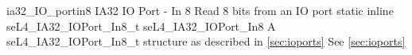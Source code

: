 %
%
%
%

\apidoc
{ia32_IO_portin8}
{IA32 IO Port - In 8}
{Read 8 bits from an IO port}
{static inline seL4\_IA32\_IOPort\_In8\_t seL4\_IA32\_IOPort\_In8 }
{
}
{A seL4\_IA32\_IOPort\_In8\_t structure as described in \autoref{sec:ioports}}
{See \autoref{sec:ioports}}
